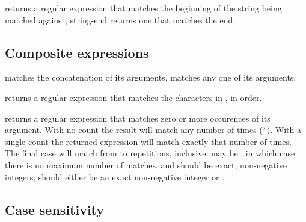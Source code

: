 \begin{protos}
\end{protos}
\noindent
{} returns a regular expression that matches the beginning
 of the string being matched against; {string-end} returns one that matches
 the end.

\subsection{Composite expressions}

\begin{protos}
\end{protos}
\noindent
{} matches the concatenation of its arguments,  matches
any one of its arguments.

\begin{protos}
\end{protos}
\noindent
{} returns a regular expression that matches the characters in
 , in order.

\begin{protos}
\end{protos}
\noindent
{} returns a regular expression that matches zero or more
occurences of its  argument.  With no count the result
will match any number of times (*).  With a single
count the returned expression will match
  exactly that number of times.
The final case will match from  to 
 repetitions, inclusive.
 may be , in which case there
 is no maximum number of matches.
 and  should be exact, non-negative integers;
  should either be an exact non-negative integer or .

\subsection{Case sensitivity}

